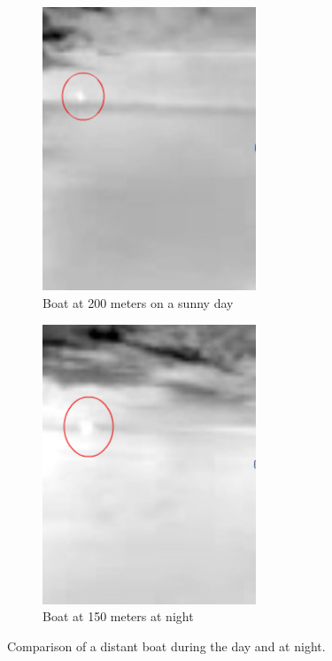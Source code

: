 \begin{figure}[h]
\centering
\begin{subfigure}{0.45\textwidth}
 \centering
 \includegraphics[width=0.7\textwidth]{"./image/boat_horizon_circled"}
 \caption{Boat at 200 meters on a sunny day}
 \label{fig:boat_horizon:sub1}
\end{subfigure}
\begin{subfigure}{0.45\textwidth}
 \centering
 \includegraphics[width=0.7\textwidth]{"./image/boat_night_circled"}
 \caption{Boat at 150 meters at night}
 \label{fig:boat_horizon:sub2}
\end{subfigure}
\caption{Comparison of a distant boat during the day and at night.}
\label{fig:boat_horizon}
\end{figure}

